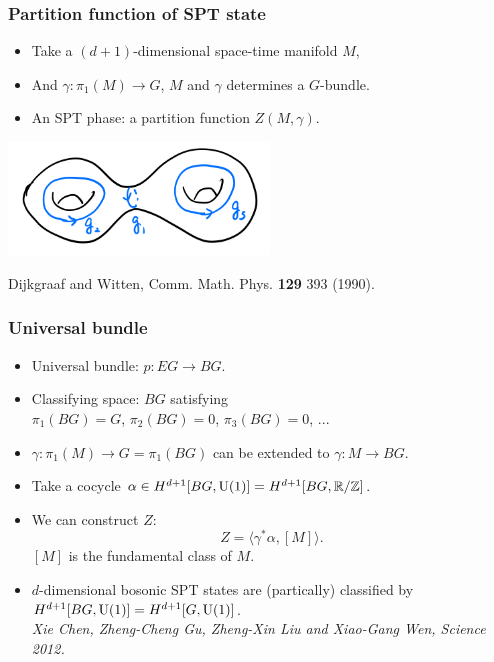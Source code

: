 \documentclass[xcolor=table, aspectratio=169,ignorenonframetext]{beamer}
\newcommand{\uone}{\text U(1)}
\begin{document}
\begin{frame}
	\frametitle{Partition function of SPT state}
	\begin{itemize}
		\item Take a $(d+1)$-dimensional space-time manifold $M$,
		\item And $\gamma:\pi_1(M)\rightarrow G$, $M$ and $\gamma$ determines a $G$-bundle.
		\item An SPT phase: a partition function $Z(M,\gamma)$.
	\end{itemize}
	\begin{center}
		\includegraphics[height=3cm]{../spt-lecture/manifold}
	\end{center}
	{\small Dijkgraaf and Witten, Comm. Math. Phys. \textbf{129} 393 (1990).}
\end{frame}

\begin{frame}
	\frametitle{Universal bundle}
	\begin{itemize}
		\item Universal bundle: $p: EG \rightarrow BG$.
		\item Classifying space: $BG$ satisfying\\
		$\pi_1(BG) = G$, $\pi_2(BG)=0$, $\pi_3(BG)=0$, ...
		\item $\gamma:\pi_1(M)\rightarrow G=\pi_1(BG)$ can be extended to $\gamma:M\rightarrow BG$.
		\item Take a cocycle $\alpha\in H^{d+1}[BG, \uone]=H^{d+1}[BG, \mathbb R/\mathbb Z]$.
		\item We can construct $Z$:
		\[Z = \langle\gamma^\ast\alpha, [M]\rangle.\]
		$[M]$ is the fundamental class of $M$.
		\item $d$-dimensional bosonic SPT states are (partically) classified by $H^{d+1}[BG, \uone]=H^{d+1}[G, \uone]$.\\
		\emph{\small Xie Chen, Zheng-Cheng Gu, Zheng-Xin Liu and Xiao-Gang Wen, Science 2012.}
	\end{itemize}
\end{frame}
\end{document}
